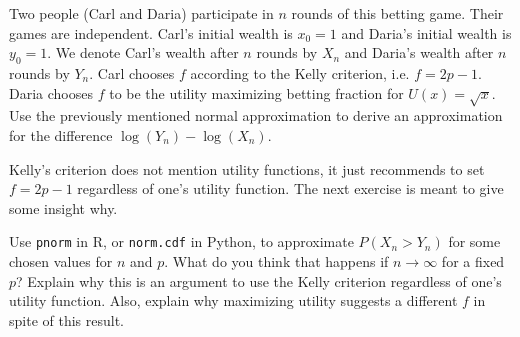 \begin{exercise}
Two people (Carl and Daria) participate in $n$ rounds of this betting game. Their games are independent. Carl's initial wealth is $x_0 = 1$ and Daria's initial wealth is $y_0 = 1$. We denote Carl's wealth after $n$ rounds by $X_n$ and Daria's wealth after $n$ rounds by $Y_n$. Carl chooses $f$ according to the Kelly criterion, i.e. $f = 2p-1$.  Daria chooses $f$ to be the  utility maximizing betting fraction for  $U(x) = \sqrt{x}$.
Use the previously mentioned normal approximation to derive an approximation for the difference $\log(Y_n) - \log(X_n)$.
\end{exercise}

Kelly's criterion does not mention utility functions, it just recommends to set $f = 2p-1$ regardless of one's utility function. The next exercise is meant to give some insight why.


\begin{exercise}
Use \texttt{pnorm} in R, or \texttt{norm.cdf} in Python, to approximate $P(X_n > Y_n)$ for some chosen values for $n$ and $p$. What do you think that happens if $n \to \infty$ for a fixed $p$? Explain why this is an argument to use the Kelly criterion  regardless of one's utility function. Also, explain why maximizing utility suggests a different $f$ in spite of this result.
\end{exercise}





